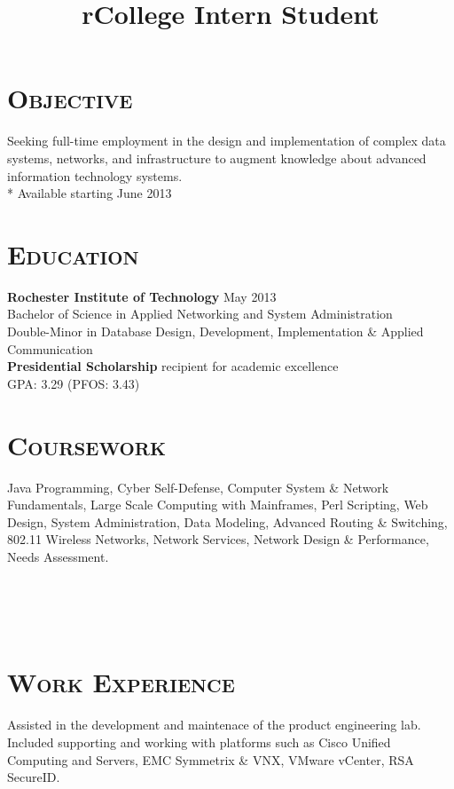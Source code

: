 \begin{resume}


\section{\textsc{Objective}}
Seeking full-time employment in the design and implementation of complex data systems, networks, and infrastructure to augment knowledge about advanced information technology systems. \\*
Available starting June 2013
\section{\textsc{Education}}

\textbf{Rochester Institute of Technology} \hfill May 2013 \\
Bachelor of Science in Applied Networking and System Administration \\
Double-Minor in Database Design, Development, Implementation \& Applied Communication \\
{\bf Presidential Scholarship} recipient for academic excellence \\
GPA: 3.29 (PFOS: 3.43)

\section{\textsc{Coursework}}

Java Programming, Cyber Self-Defense, Computer System \& Network Fundamentals, Large Scale Computing with Mainframes, Perl Scripting, Web Design, System Administration, Data Modeling, Advanced Routing \& Switching, 802.11 Wireless Networks, Network Services, Network Design \& Performance, Needs Assessment.

\begin{formatb}
  \title{r}\\
  \\
  \body\\
\end{formatb}

\section{\textsc{Work Experience}}

\title{College Intern Student}
\begin{position}
Assisted in the development and maintenace of the product engineering lab. Included supporting and working with platforms such as Cisco Unified Computing and Servers, EMC Symmetrix \& VNX, VMware vCenter, RSA SecureID.
\end{position}


\end{resume}
